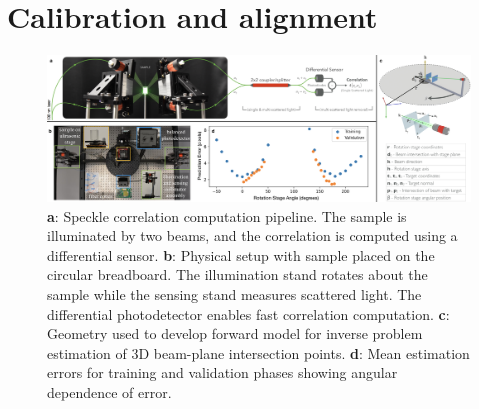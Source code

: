 
\section{Calibration and alignment}
\begin{figure}
    \centering
    \includegraphics[width=\textwidth]{../figures/experiment.png}
    \caption{\textbf{a}: Speckle correlation computation pipeline. The sample is illuminated by two beams, and the correlation is computed using a differential sensor. \textbf{b}: Physical setup with sample placed on the circular breadboard. The illumination stand rotates about the sample while the sensing stand measures scattered light. The differential photodetector enables fast correlation computation. \textbf{c}: Geometry used to develop forward model for inverse problem estimation of 3D beam-plane intersection points. \textbf{d}: Mean estimation errors for training and validation phases showing angular dependence of error.}
    \label{fig:3}
\end{figure}

